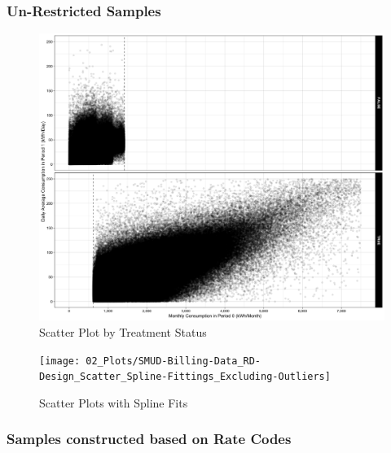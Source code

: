 \subsubsection{Un-Restricted Samples}
\begin{figure}
    \centering
    \includegraphics[scale = 0.13]{02_Plots/SMUD-Billing-Data_RD-Design_Scatter_Absolute-Consumption-in-H-Axis}
    \caption{Scatter Plot by Treatment Status}
    \label{Figure:Scatter-Plots_Absolute-Values}
\end{figure}

\clearpage
\begin{figure}
    \centering
    \texttt{[image: 02\_Plots/SMUD-Billing-Data\_RD-Design\_Scatter\_Spline-Fittings\_Excluding-Outliers]}
    \caption{Scatter Plots with Spline Fits}
    \label{Figure:Scatter-Plots-with-Splie-Fits}
\end{figure}


\clearpage
\subsubsection{Samples constructed based on Rate Codes}
\vspace{0.2cm}

